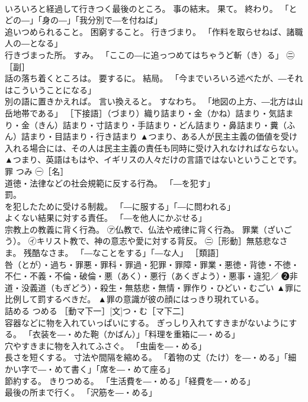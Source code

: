 \documentclass[8pt]{extreport}
\begin{document}
\begin{CJK}{UTF8}{min}
\\	いろいろと経過して行きつく最後のところ。 事の結末。 果て。 終わり。 「とどの―」「身の―」「我分別で―を付ねば」 
\\	追いつめられること。 困窮すること。 行きづまり。 「作料を取らせねば、諸職人の―となる」 
\\	行きづまった所。 すみ。 「ここの―に追っつめてはちゃうど斬（き）る」 ㊁［副］ 
\\	話の落ち着くところは。 要するに。 結局。 「今までいろいろ述べたが、―それはこういうことになる」 
\\	別の語に置きかえれば。 言い換えると。 すなわち。 「地図の上方、―北方は山岳地帯である」 ［下接語］（づまり）織り詰まり・金（かね）詰まり・気詰まり・金（きん）詰まり・寸詰まり・手詰まり・どん詰まり・鼻詰まり・糞（ふん）詰まり・目詰まり・行き詰まり	▲つまり、ある人が民主主義の価値を受け入れる場合には、その人は民主主義の責任も同時に受け入れなければならない。 ▲つまり、英語はもはや、イギリスの人々だけの言語ではないということです。
\\	罪	つみ	㊀［名］ 
\\	道徳・法律などの社会規範に反する行為。 「―を犯す」 
\\	罰。 
\\	を犯したために受ける制裁。 「―に服する」「―に問われる」 
\\	よくない結果に対する責任。 「―を他人にかぶせる」 
\\	宗教上の教義に背く行為。 ㋐仏教で、仏法や戒律に背く行為。 罪業（ざいごう）。 ㋑キリスト教で、神の意志や愛に対する背反。 ㊁［形動］無慈悲なさま。 残酷なさま。 「―なことをする」「―な人」 ［類語］ 
\\	咎（とが）・過ち・罪悪・罪科・罪過・犯罪・罪障・罪業・悪徳・背徳・不徳・不仁・不義・不倫・破倫・悪（あく）・悪行（あくぎよう）・悪事・違犯／ ❷非道・没義道（もぎどう）・殺生・無慈悲・無情・罪作り・ひどい・むごい	▲罪に比例して罰するべきだ。 ▲罪の意識が彼の顔にはっきり現れている。
\\	詰める	つめる	［動マ下一］[文]つ・む［マ下二］ 
\\	容器などに物を入れていっぱいにする。 ぎっしり入れてすきまがないようにする。 「衣装を―・めた鞄（かばん）」「料理を重箱に―・める」 
\\	穴やすきまに物を入れてふさぐ。 「虫歯を―・める」 
\\	長さを短くする。 寸法や間隔を縮める。 「着物の丈（たけ）を―・める」「細かい字で―・めて書く」「席を―・めて座る」 
\\	節約する。 きりつめる。 「生活費を―・める」「経費を―・める」 
\\	最後の所まで行く。 「沢筋を―・める」 

\end{CJK}
\end{document}
